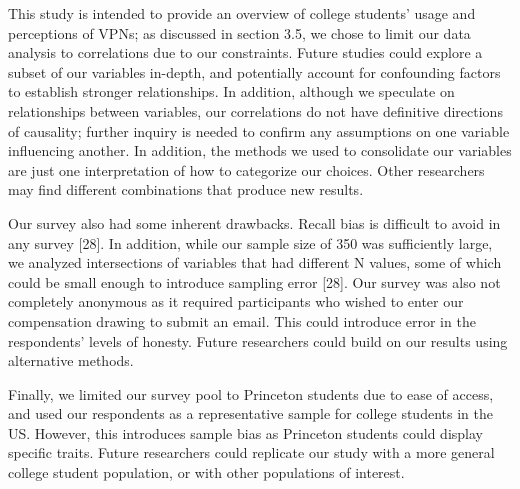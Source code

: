 This study is intended to provide an overview of college students' usage and perceptions of VPNs; as discussed in section 3.5, we chose to limit our data analysis to correlations due to our constraints. Future studies could explore a subset of our variables in-depth, and potentially account for confounding factors to establish stronger relationships. In addition, although we speculate on relationships between variables, our correlations do not have definitive directions of causality; further inquiry is needed to confirm any assumptions on one variable influencing another. In addition, the methods we used to consolidate our variables are just one interpretation of how to categorize our choices. Other researchers may find different combinations that produce new results.

Our survey also had some inherent drawbacks. Recall bias is difficult to avoid in any survey [28]. In addition, while our sample size of 350 was sufficiently large, we analyzed intersections of variables that had different N values, some of which could be small enough to introduce sampling error [28]. Our survey was also not completely anonymous as it required participants who wished to enter our compensation drawing to submit an email. This could introduce error in the respondents' levels of honesty. Future researchers could build on our results using alternative methods.

Finally, we limited our survey pool to Princeton students due to ease of access, and used our respondents as a representative sample for college students in the US. However, this introduces sample bias as Princeton students could display specific traits. Future researchers could replicate our study with a more general college student population, or with other populations of interest.